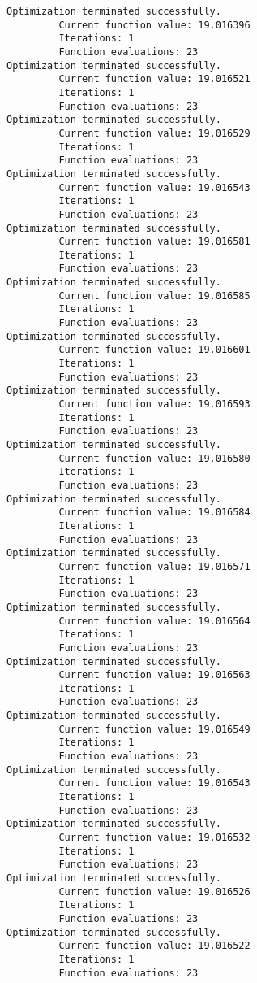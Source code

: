 \documentclass[11pt]{article}
\begin{document}
    \begin{Verbatim}[commandchars=\\\{\}]
Optimization terminated successfully.
         Current function value: 19.016396
         Iterations: 1
         Function evaluations: 23
Optimization terminated successfully.
         Current function value: 19.016521
         Iterations: 1
         Function evaluations: 23
Optimization terminated successfully.
         Current function value: 19.016529
         Iterations: 1
         Function evaluations: 23
Optimization terminated successfully.
         Current function value: 19.016543
         Iterations: 1
         Function evaluations: 23
Optimization terminated successfully.
         Current function value: 19.016581
         Iterations: 1
         Function evaluations: 23
Optimization terminated successfully.
         Current function value: 19.016585
         Iterations: 1
         Function evaluations: 23
Optimization terminated successfully.
         Current function value: 19.016601
         Iterations: 1
         Function evaluations: 23
Optimization terminated successfully.
         Current function value: 19.016593
         Iterations: 1
         Function evaluations: 23
Optimization terminated successfully.
         Current function value: 19.016580
         Iterations: 1
         Function evaluations: 23
Optimization terminated successfully.
         Current function value: 19.016584
         Iterations: 1
         Function evaluations: 23
Optimization terminated successfully.
         Current function value: 19.016571
         Iterations: 1
         Function evaluations: 23
Optimization terminated successfully.
         Current function value: 19.016564
         Iterations: 1
         Function evaluations: 23
Optimization terminated successfully.
         Current function value: 19.016563
         Iterations: 1
         Function evaluations: 23
Optimization terminated successfully.
         Current function value: 19.016549
         Iterations: 1
         Function evaluations: 23
Optimization terminated successfully.
         Current function value: 19.016543
         Iterations: 1
         Function evaluations: 23
Optimization terminated successfully.
         Current function value: 19.016532
         Iterations: 1
         Function evaluations: 23
Optimization terminated successfully.
         Current function value: 19.016526
         Iterations: 1
         Function evaluations: 23
Optimization terminated successfully.
         Current function value: 19.016522
         Iterations: 1
         Function evaluations: 23

\end{Verbatim}
\end{document}
